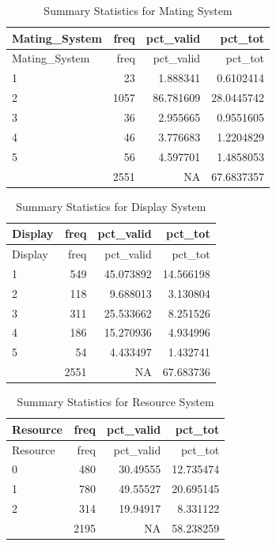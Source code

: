\documentclass[
  12pt,
]{article}
\begin{document}
\begin{longtable}[]{@{}lrrr@{}}
\caption{Summary Statistics for Mating System}\tabularnewline
\toprule
Mating\_System & freq & pct\_valid & pct\_tot \\
\midrule
\endfirsthead
\toprule
Mating\_System & freq & pct\_valid & pct\_tot \\
\midrule
\endhead
1 & 23 & 1.888341 & 0.6102414 \\
2 & 1057 & 86.781609 & 28.0445742 \\
3 & 36 & 2.955665 & 0.9551605 \\
4 & 46 & 3.776683 & 1.2204829 \\
5 & 56 & 4.597701 & 1.4858053 \\
& 2551 & NA & 67.6837357 \\
\bottomrule
\end{longtable}

\begin{longtable}[]{@{}lrrr@{}}
\caption{Summary Statistics for Display System}\tabularnewline
\toprule
Display & freq & pct\_valid & pct\_tot \\
\midrule
\endfirsthead
\toprule
Display & freq & pct\_valid & pct\_tot \\
\midrule
\endhead
1 & 549 & 45.073892 & 14.566198 \\
2 & 118 & 9.688013 & 3.130804 \\
3 & 311 & 25.533662 & 8.251526 \\
4 & 186 & 15.270936 & 4.934996 \\
5 & 54 & 4.433497 & 1.432741 \\
& 2551 & NA & 67.683736 \\
\bottomrule
\end{longtable}

\begin{longtable}[]{@{}lrrr@{}}
\caption{Summary Statistics for Resource System}\tabularnewline
\toprule
Resource & freq & pct\_valid & pct\_tot \\
\midrule
\endfirsthead
\toprule
Resource & freq & pct\_valid & pct\_tot \\
\midrule
\endhead
0 & 480 & 30.49555 & 12.735474 \\
1 & 780 & 49.55527 & 20.695145 \\
2 & 314 & 19.94917 & 8.331122 \\
& 2195 & NA & 58.238259 \\
\bottomrule
\end{longtable}

\newpage
\end{document}
